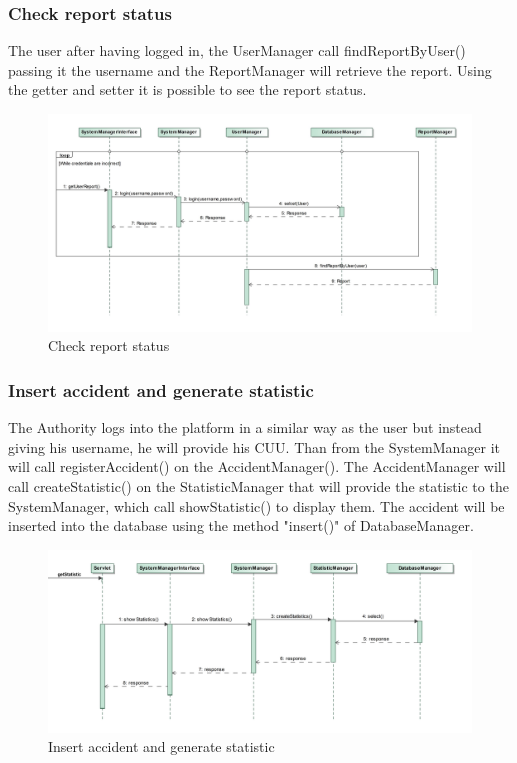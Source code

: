 \subsubsection{Check report status}
The user after having logged in, the UserManager call findReportByUser() passing it the username and the ReportManager will retrieve the report. Using the getter and setter it is possible to see the report status.
\begin{figure}[H]
	\centering
	\includegraphics[width=0.95\linewidth, height=0.4\textheight]{Images/RunTimeDiagram/Sequence3}
	\caption{Check report status}
	\label{fig:Check report status}
\end{figure}
\subsubsection{Insert accident and generate statistic}
The Authority logs into the platform in a similar way as the user but instead giving his username, he will provide his CUU. Than from the SystemManager it will call registerAccident() on the AccidentManager(). The AccidentManager will call createStatistic() on the StatisticManager that will provide the statistic to the SystemManager, which call showStatistic() to display them.
The accident will be inserted into the database using the method "insert()" of DatabaseManager.
\begin{figure}[H]
	\centering
	\includegraphics[width=0.95\linewidth, height=0.45\textheight]{Images/RunTimeDiagram/Sequence4}
	\caption{Insert accident and generate statistic}
	\label{fig:Insert accident and generate statistic}
\end{figure}
